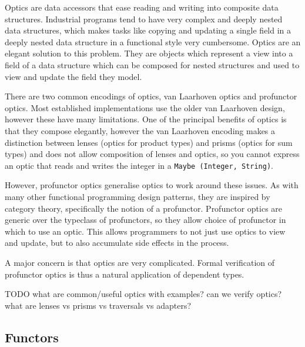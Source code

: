 \documentclass[]{report}
\begin{document}
Optics are data accessors that ease reading and writing into composite data structures. Industrial programs tend to have very complex and deeply nested data structures, which makes tasks like copying and updating a single field in a deeply nested data structure in a functional style very cumbersome. Optics are an elegant solution to this problem. They are objects which represent a view into a field of a data structure which can be composed for nested structures and used to view and update the field they model.

There are two common encodings of optics, van Laarhoven optics and profunctor optics. Most established implementations use the older van Laarhoven design, however these have many limitations. One of the principal benefits of optics is that they compose elegantly, however the van Laarhoven encoding makes a distinction between lenses (optics for product types) and prisms (optics for sum types) and does not allow composition of lenses and optics, so you cannot express an optic that reads and writes the integer in a \texttt{Maybe (Integer, String)}.

However, profunctor optics generalise optics to work around these issues. As with many other functional programming design patterns, they are inspired by category theory, specifically the notion of a profunctor. Profunctor optics are generic over the typeclass of profunctors, so they allow choice of profunctor in which to use an optic. This allows programmers to not just use optics to view and update, but to also accumulate side effects in the process.

A major concern is that optics are very complicated. Formal verification of profunctor optics is thus a natural application of dependent types.

TODO
what are common/useful optics with examples?
can we verify optics?
what are lenses vs prisms vs traversals vs adapters?

\subsection{Functors}
\end{document}

